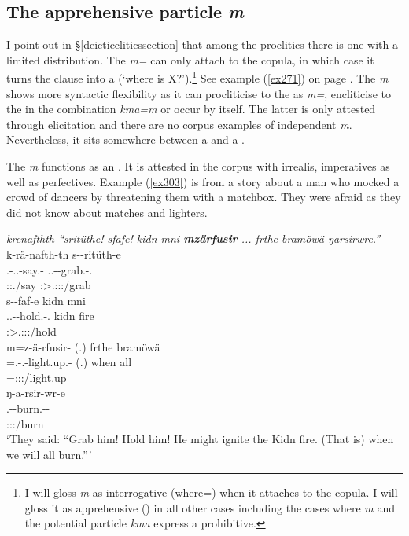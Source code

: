 \subsection{The apprehensive particle \emph{m}}\label{apprehensivem}

I point out in \S{}\ref{deicticcliticssection} that among the  proclitics there is one with a limited distribution. The \emph{m=}  can only attach to the copula, in which case it turns the clause into a  (`where is X?').\footnote{I will gloss \emph{m} as interrogative (where=) when it attaches to the copula. I will gloss it as apprehensive (\Appr) in all other cases including the cases where \emph{m} and the potential particle \emph{kma} express a prohibitive.} See example (\ref{ex271}) on page \pageref{ex271}. The \emph{m}  shows more syntactic flexibility as it can procliticise to the  as \emph{m=}, encliticise to the   in the combination \emph{kma=m} or occur by itself. The latter is only attested through elicitation and there are no corpus examples of independent \emph{m}. Nevertheless, it sits somewhere between a  and a .%

The  \emph{m} functions as an . It is attested in the corpus with irrealis, imperatives as well as perfectives. Example (\ref{ex303}) is from a story about a man who mocked a crowd of dancers by threatening them with a matchbox. They were afraid as they did not know about matches and lighters.

\begin{exe}
	\ex \emph{krenafthth ``sritüthe! sfafe! kidn mni \textbf{mzärfusir} ... frthe bramöwä ŋarsirwre.''}\\
	\glll k-rä-nafth-th s-\Zero{}-ritüth-e\\
	\M.\Bet-\Irr.\Vc.\Ndu-say.\Rs-\Stnsg{} \Tsg.\Masc.\Bet-\Du-grab.\Rs-\Stnsg{}.\Imp{}\\
	\footnotesize{\Stpl:\Sbj:\Irr.\Pfv/say} \footnotesize{\Sdu:\Sbj>\Tsg.\Masc:\Obj:\Imp:\Pfv/grab}\\
	\sn
	\glll s-\Zero{}-faf-e kidn mni\\
	\Tsg.\Masc.\Bet-\Du-hold.\Rs-\Stnsg{}.\Imp{} kidn fire\\
	\footnotesize{\Sdu:\Sbj>\Tsg.\Masc:\Obj:\Imp:\Pfv/hold} {} {}\\
	\sn
	\glll m=z-ä-rfusir-\Zero{} (.) frthe bramöwä\\
	\Appr=\M.\Gam-\Vc.\Ndu-light.up.\Rs{}-\Stsg{} (.) when all\\
	\footnotesize{\Appr=\Stsg:\Sbj:\Rpst:\Pfv/light.up} {} {} {}\\
	\sn
	\glll ŋ-a-rsir-wr-e\\
	\M.\Alph-\Vc-burn.\Ext-\Ndu-\Fnsg{}\\
	\footnotesize{\Fpl:\Sbj:\Nonpast:\Ipfv/burn}\\
	\trans `They said: ``Grab him! Hold him! He might ignite the Kidn fire. (That is) when we will all burn.'''
	\label{ex303}
\end{exe}

